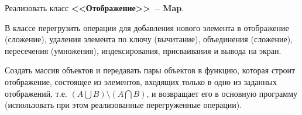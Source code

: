 Реализовать класс \textbf{<<Отображение>>~-- Map}.

В классе перегрузить операции для добавления нового элемента в
отображение (сложение), удаления элемента по ключу (вычитание), объединения
(сложение), пересечения (умножения), индексирования, присваивания и вывода на экран.

Создать массив объектов и передавать пары объектов в функцию, которая строит
отображение, состоящее из элементов, входящих только в одно из заданных отображений,
т.е. $(A\bigcup B) \setminus (A\bigcap B)$, и возвращает его в основную программу (использовать при этом
реализованные перегруженные операции).
